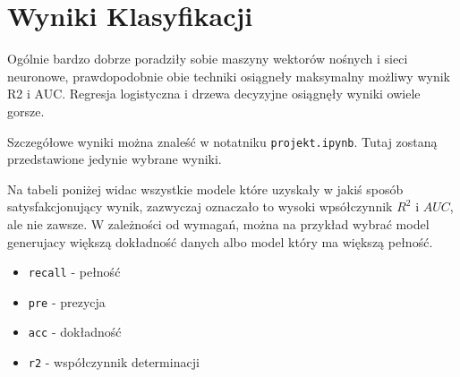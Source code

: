 \documentclass[12pt]{article}
\def\code#1{\texttt{#1}}
\begin{document}
        \section{Wyniki Klasyfikacji}

        Ogólnie bardzo dobrze poradziły sobie maszyny wektorów nośnych i sieci neuronowe, prawdopodobnie obie techniki 
        osiągneły maksymalny możliwy wynik R2 i AUC. Regresja logistyczna i drzewa decyzyjne osiągnęły wyniki owiele gorsze. 

        Szczegółowe wyniki można znaleść w notatniku \code{projekt.ipynb}. Tutaj zostaną przedstawione jedynie wybrane wyniki.

        Na tabeli poniżej widac wszystkie modele które uzyskały w jakiś sposób satysfakcjonujący wynik, zazwyczaj oznaczało to
        wysoki wpsółczynnik $R^2$ i $AUC$, ale nie zawsze. W zależności od wymagań, można na przykład wybrać model generujacy większą 
        dokładność danych albo model który ma większą pełność.

        \begin{itemize}
            \item \code{recall} - pełność
            \item \code{pre} - prezycja
            \item \code{acc} - dokładność
            \item \code{r2} - współczynnik determinacji
        \end{itemize}

        \newpage
\end{document}
